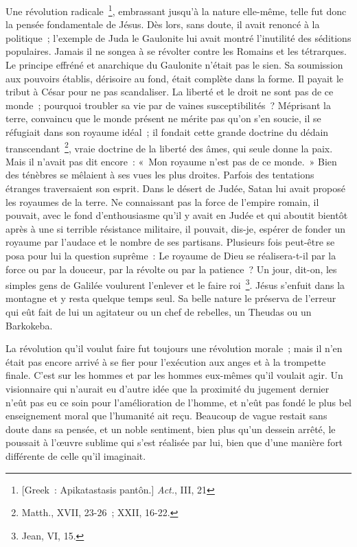 \documentclass[french,twoside]{book} %
\begin{document}
Une révolution radicale \footnote{ [Greek : Apikatastasis pantôn.] {\itshape Act.}, III, 21}, embrassant jusqu’à la nature elle-même, telle fut donc la pensée fondamentale de Jésus. Dès lors, sans doute, il avait renoncé à la politique ; l’exemple de Juda le Gaulonite lui avait montré l’inutilité des séditions populaires. Jamais il ne songea à se révolter contre les Romains et les tétrarques. Le principe effréné et anarchique du Gaulonite n’était pas le sien. Sa soumission aux pouvoirs établis, dérisoire au fond, était complète dans la forme. Il payait le tribut à César pour ne pas scandaliser. La liberté et le droit ne sont pas de ce monde ; pourquoi troubler sa vie par de vaines susceptibilités ? Méprisant la terre, convaincu que le monde présent ne mérite pas qu’on s’en soucie, il se réfugiait dans son royaume idéal ; il fondait cette grande doctrine du dédain transcendant \footnote{Matth., XVII, 23-26 ; XXII, 16-22.}, vraie doctrine de la liberté des âmes, qui seule donne la paix. Mais il n’avait pas dit encore : « Mon royaume n’est pas de ce monde. » Bien des ténèbres se mêlaient à ses vues les plus droites. Parfois des tentations étranges traversaient son esprit. Dans le désert de Judée, Satan lui avait proposé les royaumes de la terre. Ne connaissant pas la force de l’empire romain, il pouvait, avec le fond d’enthousiasme qu’il y avait en Judée et qui aboutit bientôt après à une si terrible résistance militaire, il pouvait, dis-je, espérer de fonder un royaume par l’audace et le nombre de ses partisans. Plusieurs fois peut-être se posa pour lui la question suprême : Le royaume de Dieu se réalisera-t-il par la force ou par la douceur, par la révolte ou par la patience ? Un jour, dit-on, les simples gens de Galilée voulurent l’enlever et le faire roi \footnote{Jean, VI, 15.}. Jésus s’enfuit dans la montagne et y resta quelque temps seul. Sa belle nature le préserva de l’erreur qui eût fait de lui un agitateur ou un chef de rebelles, un Theudas ou un Barkokeba.\par
La révolution qu’il voulut faire fut toujours une révolution morale ; mais il n’en était pas encore arrivé à se fier pour l’exécution aux anges et à la trompette finale. C’est sur les hommes et par les hommes eux-mêmes qu’il voulait agir. Un visionnaire qui n’aurait eu d’autre idée que la proximité du jugement dernier n’eût pas eu ce soin pour l’amélioration de l’homme, et n’eût pas fondé le plus bel enseignement moral que l’humanité ait reçu. Beaucoup de vague restait sans doute dans sa pensée, et un noble sentiment, bien plus qu’un dessein arrêté, le poussait à l’œuvre sublime qui s’est réalisée par lui, bien que d’une manière fort différente de celle qu’il imaginait.\par
\end{document}
